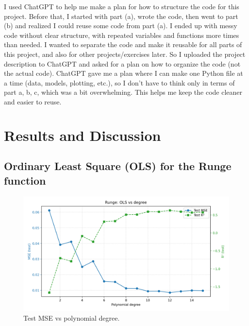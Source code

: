 \documentclass[amssymb,twocolumn,aps]{revtex4}
\begin{document}
I used ChatGPT to help me make a plan for how to structure the code for this project. Before that, I started with part (a), wrote the code, then went to part (b) and realized I could reuse some code from part (a). I ended up with messy code without clear structure, with repeated variables and functions more times than needed. I wanted to separate the code and make it reusable for all parts of this project, and also for other projects/exercises later. So I uploaded the project description to ChatGPT and asked for a plan on how to organize the code (not the actual code). ChatGPT gave me a plan where I can make one Python file at a time (data, models, plotting, etc.), so I don’t have to think only in terms of part a, b, c, which was a bit overwhelming. This helps me keep the code cleaner and easier to reuse.
	
\section{Results and Discussion}\label{section:results} 

\subsection{Ordinary Least Square (OLS) for the Runge function}

\begin{figure}[h]
    \centering
    \includegraphics[width=1\linewidth]{Project-1/Figures/runge_ols_mse_r2_vs_degree.png}
    \caption{Test MSE vs polynomial degree. }
    \label{fig:ols_vs_degree}
\end{figure}

\subsection{}
\end{document}
